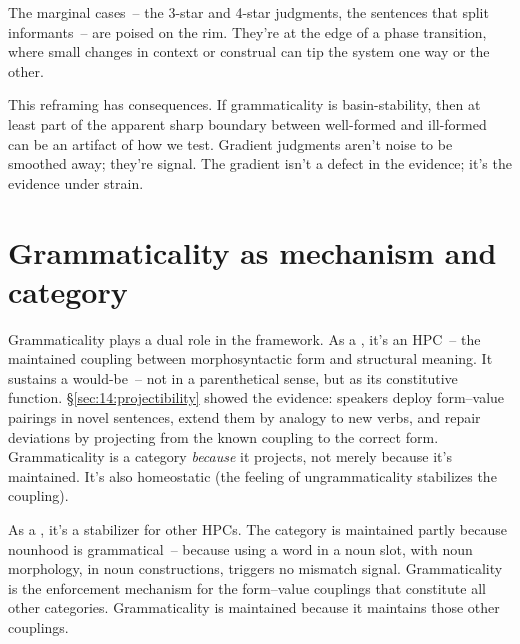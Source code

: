The marginal cases~-- the 3-star and 4-star judgments, the sentences that split informants~-- are poised on the rim. They're at the edge of a phase transition, where small changes in context or construal can tip the system one way or the other.

This reframing has consequences. If grammaticality is basin-stability, then at least part of the apparent sharp boundary between well-formed and ill-formed can be an artifact of how we test. Gradient judgments aren't noise to be smoothed away; they're signal. The gradient isn't a defect in the evidence; it's the evidence under strain.


\section{Grammaticality as mechanism and category}
\label{sec:14:dual-role}

Grammaticality plays a dual role in the framework. As a , it's an HPC~-- the maintained coupling between morphosyntactic form and structural meaning. It sustains a would-be~-- not in a parenthetical sense, but as its constitutive function. §\ref{sec:14:projectibility} showed the evidence: speakers deploy form--value pairings in novel sentences, extend them by analogy to new verbs, and repair deviations by projecting from the known coupling to the correct form. Grammaticality is a category \emph{because} it projects, not merely because it's maintained. It's also homeostatic (the feeling of ungrammaticality stabilizes the coupling).

As a , it's a stabilizer for other HPCs. The category  is maintained partly because nounhood is grammatical~-- because using a word in a noun slot, with noun morphology, in noun constructions, triggers no mismatch signal. Grammaticality is the enforcement mechanism for the form--value couplings that constitute all other categories. Grammaticality is maintained because it maintains those other couplings.

